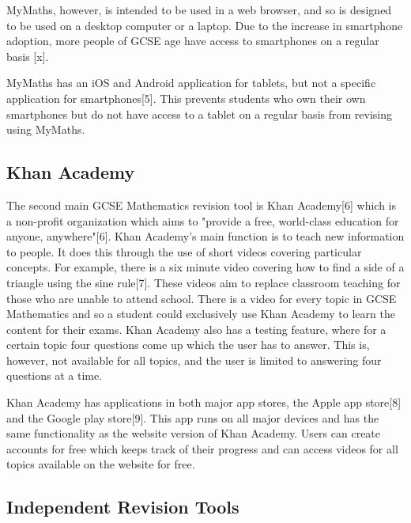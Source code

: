\documentclass{article}
\begin{document}
MyMaths, however, is intended to be used in a web browser, and so is designed to be used on a desktop computer or a laptop. Due to the increase in smartphone adoption, more people of GCSE age have access to smartphones on a regular basis [x]. 







MyMaths has an iOS and Android application for tablets, but not a specific application for smartphones[5]. This prevents students who own their own smartphones but do not have access to a tablet on a regular basis from revising using MyMaths. \par

\subsection{Khan Academy}

The second main GCSE Mathematics revision tool is Khan Academy[6] which is a non-profit organization which aims to "provide a free, world-class education for anyone, anywhere"[6]. Khan Academy's main function is to teach new information to people. It does this through the use of short videos covering particular concepts. For example, there is a six minute video covering how to find a side of a triangle using the sine rule[7]. These videos aim to replace classroom teaching for those who are unable to attend school. There is a video for every topic in GCSE Mathematics and so a student could exclusively use Khan Academy to learn the content for their exams. Khan Academy also has a testing feature, where for a certain topic four questions come up which the user has to answer. This is, however, not available for all topics, and the user is limited to answering four questions at a time. \par

Khan Academy has applications in both major app stores, the Apple app store[8] and the Google play store[9]. This app runs on all major devices and has the same functionality as the website version of Khan Academy. Users can create accounts for free which keeps track of their progress and can access videos for all topics available on the website for free. \par

\subsection{Independent Revision Tools}
\end{document}
